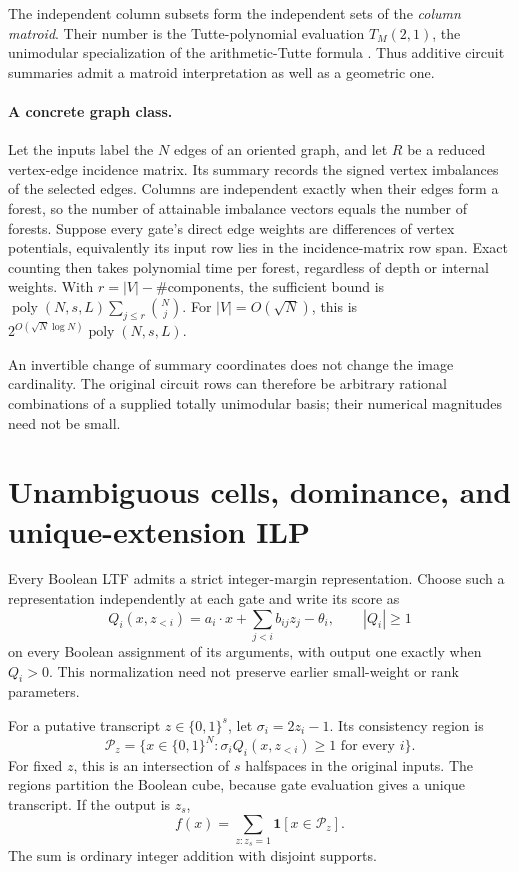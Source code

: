 \documentclass[11pt]{article}
\theoremstyle{definition}
\newcommand{\bits}{\{0,1\}}
\newcommand{\ind}[1]{\mathbf 1[#1]}
\newcommand{\poly}{\operatorname{poly}}
\begin{document}
The independent column subsets form the independent sets of the
\emph{column matroid}. Their number is the Tutte-polynomial evaluation
\(T_M(2,1)\), the unimodular specialization of the arithmetic-Tutte
formula \cite{DM11}. Thus additive circuit summaries admit a matroid
interpretation as well as a geometric one.

\paragraph{A concrete graph class.}
Let the inputs label the \(N\) edges of an oriented graph, and let \(R\)
be a reduced vertex-edge incidence matrix. Its summary records the signed
vertex imbalances of the selected edges. Columns are independent exactly
when their edges form a forest, so the number of attainable imbalance
vectors equals the number of forests. Suppose every gate's direct edge
weights are differences of vertex potentials, equivalently its input row
lies in the incidence-matrix row span. Exact counting then takes polynomial
time per forest, regardless of depth or internal weights. With
\(r=|V|-\#\text{components}\), the sufficient bound is
\(\poly(N,s,L)\sum_{j\le r}\binom Nj\). For
\(|V|=O(\sqrt N)\), this is
\(2^{O(\sqrt N\log N)}\poly(N,s,L)\).

An invertible change of summary coordinates does not change the image
cardinality. The original circuit rows can therefore be arbitrary rational
combinations of a supplied totally unimodular basis; their numerical
magnitudes need not be small.



\section{Unambiguous cells, dominance, and unique-extension ILP}\label{sec:ILP}
Every Boolean LTF admits a strict integer-margin representation. Choose such a representation independently at each gate and write its score as
\[
 Q_i(x,z_{<i})=a_i\cdot x+\sum_{j<i}b_{ij}z_j-\theta_i,
 \qquad |Q_i|\ge1
\]
on every Boolean assignment of its arguments, with output one exactly when \(Q_i>0\). This normalization need not preserve earlier small-weight or rank parameters.

For a putative transcript \(z\in\bits^s\), let \(\sigma_i=2z_i-1\). Its consistency region is
\[
 \mathcal P_z=\{x\in\bits^N:
     \sigma_i Q_i(x,z_{<i})\ge1\text{ for every }i\}.      \tag{23}
\]
For fixed \(z\), this is an intersection of \(s\) halfspaces in the original inputs. The regions partition the Boolean cube, because gate evaluation gives a unique transcript. If the output is \(z_s\),
\[
 f(x)=\sum_{z:z_s=1}\ind{x\in\mathcal P_z}.                \tag{24}
\]
The sum is ordinary integer addition with disjoint supports.
\end{document}
